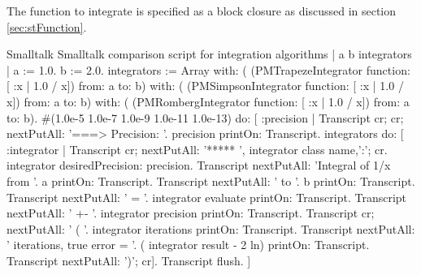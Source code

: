 The function to integrate is specified as a block closure as
discussed in section \ref{sec:stFunction}.
\begin{listing}[label=lst:intcompare]{Smalltalk}
{Smalltalk comparison script for integration algorithms}
| a b  integrators |
a := 1.0.
b := 2.0.
integrators := Array with: (
            (PMTrapezeIntegrator function: [ :x | 1.0 / x]) from: a to: b)
            with: (
            (PMSimpsonIntegrator function: [ :x | 1.0 / x]) from: a to: b)
            with: (
            (PMRombergIntegrator function: [ :x | 1.0 / x]) from: a to: b).
#(1.0e-5 1.0e-7 1.0e-9 1.0e-11 1.0e-13) do: 
[ :precision |
   Transcript cr; cr; nextPutAll: '===> Precision: '.
   precision printOn: Transcript.
   integrators do:
      [ :integrator |
      Transcript cr; nextPutAll: '*****   ', integrator class name,':'; cr.
      integrator desiredPrecision: precision.
      Transcript nextPutAll: 'Integral of 1/x from '.
      a printOn: Transcript.
      Transcript nextPutAll: ' to '.
      b printOn: Transcript.
      Transcript nextPutAll: ' = '.
      integrator evaluate printOn: Transcript.
      Transcript nextPutAll: ' +- '.
      integrator precision printOn: Transcript.
      Transcript cr; nextPutAll: ' ( '.
      integrator iterations printOn: Transcript.
      Transcript nextPutAll: ' iterations, true error = '.
      ( integrator result - 2 ln) printOn: Transcript.
      Transcript nextPutAll: ')'; cr].
   Transcript flush.
]
\end{listing}



